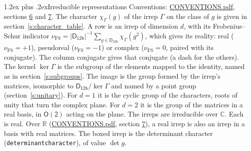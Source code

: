 \documentclass[10pt,a4paper]{article}
\makeatletter
\renewcommand\section{\@startsection{section}{1}{\z@}{-3ex plus -1ex minus -.2ex}%
  {1.2ex plus .2ex}{\normalfont\large\sffamily\bfseries\color{parttitle}}}
\numberwithin{equation}{section}
\newcommand{\grp}[1]{\mathsf{#1}}
\newcommand{\irchar}[1]{\chi_{#1}}
\newcommand{\fsind}{\nu_{\mathrm{FS}}}
\makeatother
\begin{document}
\section{Irreducible representations}\label{s:irreps}
Conventions: \href{../../CONVENTIONS.pdf}{CONVENTIONS.pdf}, sections \href{../../CONVENTIONS.pdf\#conv.6}{6} and \href{../../CONVENTIONS.pdf\#conv.7}{7}.
\leavevmode\label{n:function.character}\label{n:irrep.Gamma}The character $\irchar{\Gamma}(g)$ of the irrep $\Gamma$ on the class of $g$ is given in section~\ref{s:character_table}.
\leavevmode\label{n:index.dimension}\label{n:index.frobenius}\label{n:head.irrep}\label{n:head.reality}A row is an irrep of dimension $d$, with its Frobenius--Schur indicator $\fsind = |\grp{D_{12h}}|^{-1}\allowbreak\sum_{g\in\grp{D_{12h}}}\irchar{\Gamma}(g^2)$, which gives its reality: real ($\fsind = +1$), pseudoreal ($\fsind = -1$) or complex ($\fsind = 0$, paired with its conjugate). \label{n:head.conjugate}The column conjugate gives that conjugate (a dash for the others). \label{n:head.kernel}The kernel $\ker\Gamma$ is the subgroup of the elements mapped to the identity, named as in section~\ref{s:subgroups}. \label{n:head.image}The image is the group formed by the irrep's matrices, isomorphic to $\grp{D_{12h}}/\ker\Gamma$ and named by a point group (section~\ref{s:unitary}). For $d = 1$ it is the cyclic group of the characters, roots of unity that turn the complex plane. For $d = 2$ it is the group of the matrices in a real basis, in $\grp{O(2)}$ acting on the plane. The irreps are irreducible over $\mathbb{C}$. Each is real. Over $\mathbb{R}$ (\href{../../CONVENTIONS.pdf}{CONVENTIONS.pdf}, section \href{../../CONVENTIONS.pdf\#conv.7}{7}), a real irrep is also an irrep in a basis with real matrices. \label{n:mark.determinant}The boxed irrep is the determinant character (\texttt{determinantcharacter}), of value $\det g$.
\setlength{\emergencystretch}{2em}\par\setlength{\emergencystretch}{0pt}
\end{document}
